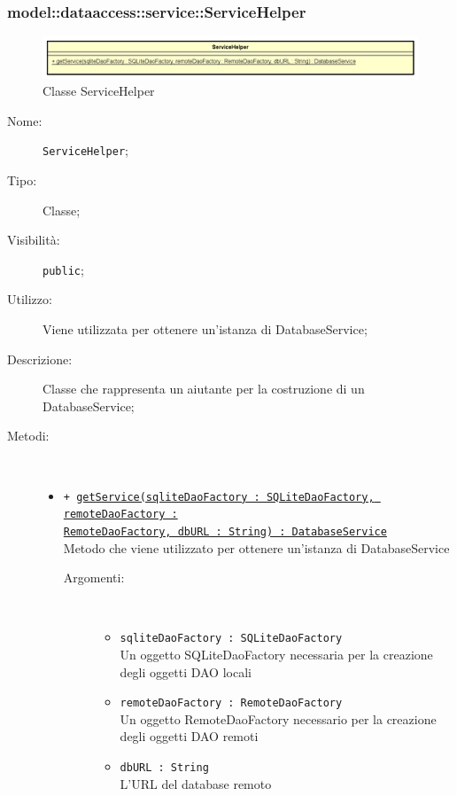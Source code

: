 \documentclass[../DefinizioneDiProdotto.tex]{subfiles}
\begin{document}
\subsubsection{model::dataaccess::service::ServiceHelper}

    \begin{figure}[H]
        \centering
        \includegraphics{img/ServiceHelper.png}
        \caption{Classe ServiceHelper}\label{fig:model::dataaccess::service::ServiceHelper} 
    \end{figure}
    \begin{description}
\item[Nome:] \texttt{ServiceHelper};
\item[Tipo:] Classe;
\item[Visibilità:] \texttt{public};
\item[Utilizzo:] Viene utilizzata per ottenere un'istanza di DatabaseService;
\item[Descrizione:] Classe che rappresenta un aiutante per la costruzione di un DatabaseService;
\item[Metodi:] \
\begin{itemize}
\item \texttt{+ \underline{getService(sqliteDaoFactory : SQLiteDaoFactory, remoteDaoFactory :}\\\underline{RemoteDaoFactory, dbURL : String) : DatabaseService}}\\
Metodo che viene utilizzato per ottenere un'istanza di DatabaseService
 \begin{description}
\item[Argomenti:] \
\begin{itemize}
\item \texttt{sqliteDaoFactory : SQLiteDaoFactory}\\
Un oggetto SQLiteDaoFactory necessaria per la creazione degli oggetti DAO locali\item \texttt{remoteDaoFactory : RemoteDaoFactory}\\
Un oggetto RemoteDaoFactory necessario per la creazione degli oggetti DAO remoti\item \texttt{dbURL : String}\\
L'URL del database remoto\end{itemize}
\end{description}
\end{itemize}
\end{description}
\end{document}
